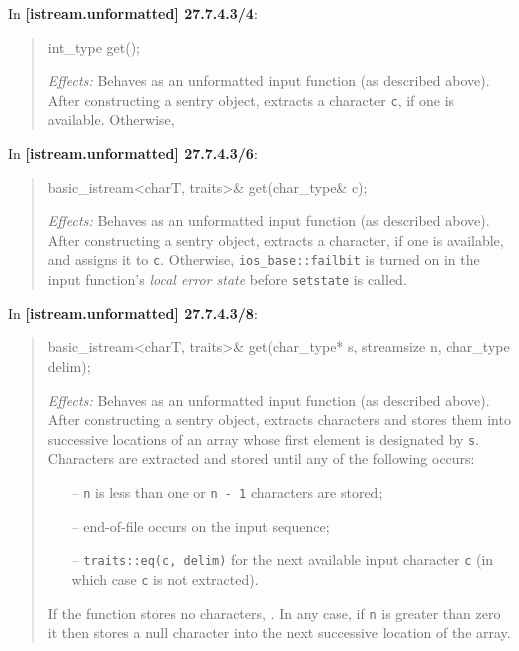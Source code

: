 \documentclass{wg21}
\begin{document}
In \textbf{[istream.unformatted] 27.7.4.3/4}:
\begin{quote}
\begin{codeblock}
int_type get();
\end{codeblock}
\textit{Effects:} Behaves as an unformatted input function (as described above).
After constructing a sentry object, extracts a character \texttt{c}, if one is
available. Otherwise, 
\end{quote}

In \textbf{[istream.unformatted] 27.7.4.3/6}:
\begin{quote}
\begin{codeblock}
basic_istream<charT, traits>& get(char_type& c);
\end{codeblock}
\textit{Effects:} Behaves as an unformatted input function (as described above).
After constructing a sentry object, extracts a character, if one is available,
and assigns it to \texttt{c}. Otherwise, 
{\texttt{ios_base::failbit} is turned on in the input function's \textit{local error state}
before \texttt{setstate} is called}.
\end{quote}

In \textbf{[istream.unformatted] 27.7.4.3/8}:
\begin{quote}
\begin{codeblock}
basic_istream<charT, traits>& get(char_type* s, streamsize n, char_type delim);
\end{codeblock}
\textit{Effects:} Behaves as an unformatted input function (as described above).
After constructing a sentry object, extracts characters and stores them into
successive locations of an array whose first element is designated by \texttt{s}.
Characters are extracted and stored until any of the following occurs:
\begin{itemize}
  \item[--] \texttt{n} is less than one or \texttt{n - 1} characters are stored;
  \item[--] end-of-file occurs on the input sequence;
  \item[--] \texttt{traits::eq(c, delim)} for the next available input character
            \texttt{c} (in which case \texttt{c} is not extracted).
\end{itemize}
If the function stores no characters, .
In any case, if \texttt{n} is greater than zero it then stores a
null character into the next successive location of the array.
\end{quote}
\end{document}
